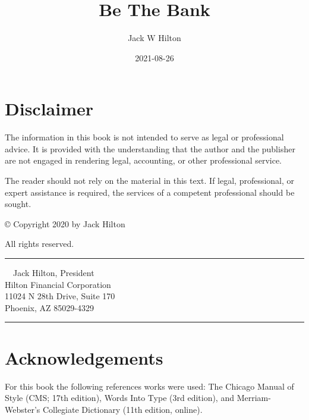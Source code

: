 \documentclass[
]{book}
\title{Be The Bank}
\author{Jack W Hilton}
\date{2021-08-26}
\begin{document}
\maketitle

{
\setcounter{tocdepth}{1}
\tableofcontents
}
\hypertarget{disclaimer}{%
\chapter*{Disclaimer}\label{disclaimer}}


The information in this book is not intended to serve as legal or professional advice. It is provided with the understanding that the author and the publisher are not engaged in rendering legal, accounting, or other professional service.

The reader should not rely on the material in this text. If legal, professional, or expert assistance is required, the services of a competent professional should be sought.

© Copyright 2020 by Jack Hilton

All rights reserved.

\begin{center}\rule{0.5\linewidth}{0.5pt}\end{center}

~~Jack Hilton, President\\
\hspace*{0.333em}\hspace*{0.333em}Hilton Financial Corporation\\
\hspace*{0.333em}\hspace*{0.333em}11024 N 28th Drive, Suite 170\\
\hspace*{0.333em}\hspace*{0.333em}Phoenix, AZ 85029-4329

\begin{center}\rule{0.5\linewidth}{0.5pt}\end{center}

\hypertarget{acknowledgements}{%
\chapter*{Acknowledgements}\label{acknowledgements}}


For this book the following references works were used: The Chicago Manual of Style (CMS; 17th edition), Words Into Type (3rd edition), and Merriam-Webster's Collegiate Dictionary (11th edition, online).
\end{document}
